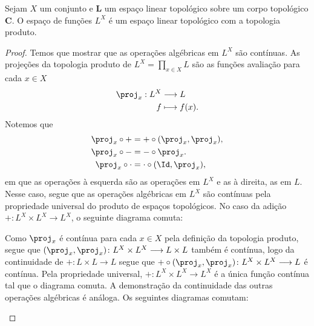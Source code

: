 \begin{prop}
Sejam $X$ um conjunto e $\bm L$ um espaço linear topológico sobre um corpo topológico $\bm C$. O espaço de funções $L^X$ é um espaço linear topológico com a topologia produto.
\end{prop}
\begin{proof}
Temos que mostrar que as operações algébricas em $L^X$ são contínuas. As projeções da topologia produto de $L^X = \prod_{x \in X} L$ são as funções avaliação para cada $x \in X$
	\begin{align*}
	\func{\proj_x}{L^X}{L}{f}{f(x).}
	\end{align*}
Notemos que
	\begin{align*}
	\proj_x \circ + &= + \circ (\proj_x,\proj_x),\\
	\proj_x \circ - &= - \circ \proj_x.\\
	\proj_x \circ \cdot &= \cdot \circ (\Id,\proj_x),
	\end{align*}
em que as operações à esquerda são as operações em $L^X$ e as à direita, as em $L$. Nesse caso, segue que as operações algébricas em $L^X$ são contínuas pela propriedade universal do produto de espaços topológicos. No caso da adição $+\colon L^X \times L^X \to L^X$, o seguinte diagrama comuta:
\begin{figure}
\centering
{}
\end{figure}
Como $\proj_x$ é contínua para cada $x \in X$ pela definição da topologia produto, segue que $(\proj_x,\proj_x)\colon L^X \times L^X \to L \times L$ também é contínua, logo da continuidade de $+\colon L \times L \to L$ segue que $+ \circ (\proj_x,\proj_x)\colon L^X \times L^X \to L$ é contínua. Pela propriedade universal, $+\colon L^X \times L^X \to L^X$ é a única função contínua tal que o diagrama comuta. A demonstração da continuidade das outras operações algébricas é análoga. Os seguintes diagramas comutam:
\begin{figure}
\centering
{}
\hspace{3cm}
\end{figure}
\end{proof}


